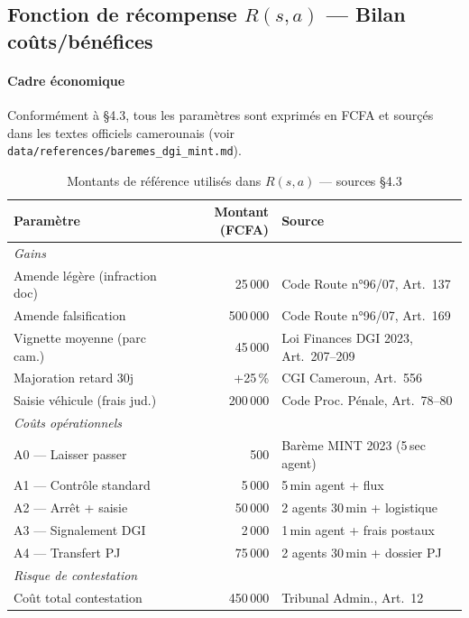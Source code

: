 \subsection{Fonction de r\'{e}compense $R(s,a)$ --- Bilan co\^{u}ts/b\'{e}n\'{e}fices}

\paragraph{Cadre \'{e}conomique}
Conform\'{e}ment \`{a} §4.3, tous les param\`{e}tres sont exprim\'{e}s en FCFA et
sour\c{c}\'{e}s dans les textes officiels camerounais
(voir \texttt{data/references/baremes\_dgi\_mint.md}).

\begin{table}[H]
\centering
\caption{Montants de r\'{e}f\'{e}rence utilis\'{e}s dans $R(s,a)$ --- sources §4.3}
\label{tab:c:baremes}
\begin{tabular}{lrl}
\toprule
\textbf{Param\`{e}tre} & \textbf{Montant (FCFA)} & \textbf{Source} \\
\midrule
\multicolumn{3}{l}{\textit{Gains}} \\
Amende l\'{e}g\`{e}re (infraction doc) & 25\,000 & Code Route n°96/07, Art.~137 \\
Amende falsification & 500\,000 & Code Route n°96/07, Art.~169 \\
Vignette moyenne (parc cam.) & 45\,000 & Loi Finances DGI 2023, Art.~207--209 \\
Majoration retard 30j & +25\,\% & CGI Cameroun, Art.~556 \\
Saisie v\'{e}hicule (frais jud.) & 200\,000 & Code Proc. P\'{e}nale, Art.~78--80 \\
\midrule
\multicolumn{3}{l}{\textit{Co\^{u}ts op\'{e}rationnels}} \\
A0 --- Laisser passer & 500 & Bar\`{e}me MINT 2023 (5\,sec agent) \\
A1 --- Contr\^{o}le standard & 5\,000 & 5\,min agent + flux \\
A2 --- Arr\^{e}t + saisie & 50\,000 & 2 agents 30\,min + logistique \\
A3 --- Signalement DGI & 2\,000 & 1\,min agent + frais postaux \\
A4 --- Transfert PJ & 75\,000 & 2 agents 30\,min + dossier PJ \\
\midrule
\multicolumn{3}{l}{\textit{Risque de contestation}} \\
Co\^{u}t total contestation & 450\,000 & Tribunal Admin., Art.~12 \\
\bottomrule
\end{tabular}
\end{table}

